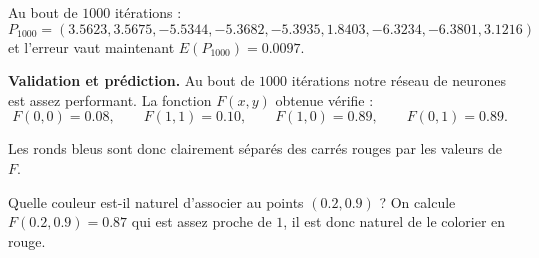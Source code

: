 Au bout de $1000$ itérations :
$$P_{1000} = (3.5623, 3.5675, -5.5344, -5.3682, -5.3935, 1.8403, -6.3234, -6.3801, 3.1216)$$
et l'erreur vaut maintenant $E(P_{1000}) = 0.0097$.

\bigskip

\textbf{Validation et prédiction.}
Au bout de $1000$ itérations notre réseau de neurones est assez performant.
La fonction $F(x,y)$ obtenue vérifie :
$$F(0,0) = 0.08, \qquad F(1,1) = 0.10, \qquad F(1,0) = 0.89,  \qquad F(0,1) = 0.89.$$

Les ronds bleus sont donc clairement séparés des carrés rouges par les valeurs de $F$.

Quelle couleur est-il naturel d'associer au points $(0.2,0.9)$ ?
On calcule $F(0.2,0.9) = 0.87$ qui est assez proche de $1$, il est donc naturel de le colorier en rouge.

\bigskip


